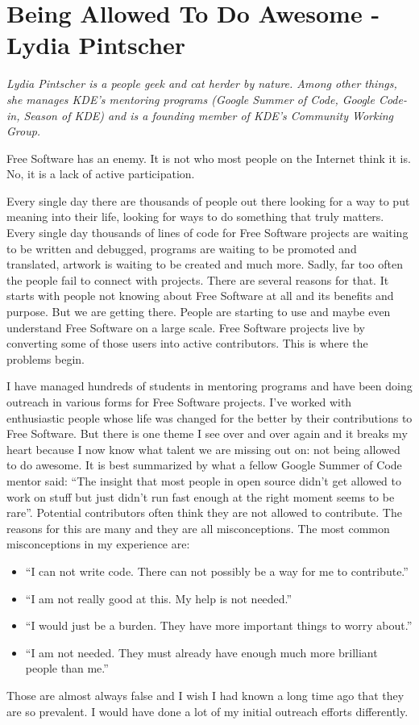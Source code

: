 \chapter{Being Allowed To Do Awesome - Lydia Pintscher}

\textit{Lydia Pintscher is a people geek and cat herder by nature. Among other
things, she manages KDE's mentoring programs (Google Summer of Code, Google
Code-in, Season of KDE) and is a founding member of KDE's Community Working
Group.}

Free Software has an enemy. It is not who most people on the Internet think it
is. No, it is a lack of active participation.

Every single day there are thousands of people out there looking for a way to
put meaning into their life, looking for ways to do something that truly
matters. Every single day thousands of lines of code for Free Software projects
are waiting to be written and debugged, programs are waiting to be promoted and
translated, artwork is waiting to be created and much more. Sadly, far too often
the people fail to connect with projects. There are several reasons for
that. It starts with people not knowing about Free Software at all and its
benefits and purpose. But we are getting there. People are starting to use and
maybe even understand Free Software on a large scale. Free Software projects
live by converting some of those users into active contributors. This is where
the problems begin.

I have managed hundreds of students in mentoring programs and have been doing
outreach in various forms for Free Software projects. I've worked with
enthusiastic people whose life was changed for the better by their contributions
to Free Software. But there is one theme I see over and over again and it breaks
my heart because I now know what talent we are missing out on: not being allowed
to do awesome. It is best summarized by what a fellow Google Summer of Code
mentor said: ``The insight that most people in open source didn’t get allowed to
work on stuff but just didn’t run fast enough at the right moment seems to be
rare''. Potential contributors often think they are not allowed to contribute.
The reasons for this are many and they are all misconceptions. The most common
misconceptions in my experience are:
\begin{itemize}
 \item ``I can not write code. There can not possibly be a way for me to
contribute.''
 \item ``I am not really good at this. My help is not needed.''
 \item ``I would just be a burden. They have more important things to worry
about.''
 \item ``I am not needed. They must already have enough much more brilliant
people than me.''
\end{itemize}
Those are almost always false and I wish I had known a long time ago that they
are so prevalent. I would have done a lot of my initial outreach efforts
differently.

